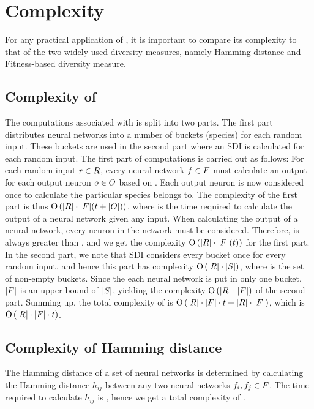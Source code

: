 \section{Complexity}\label{sec:complexity}
For any practical application of \dia{}, it is important to compare its complexity to that of the two widely used diversity measures, namely Hamming distance and Fitness-based diversity measure.

\subsection{Complexity of \dia}
The computations associated with \dia{} is split into two parts. The first part distributes neural networks into a number of buckets (species) for each random input. These buckets are used in the second part where an SDI is calculated for each random input. The first part of computations is carried out as follows: For each random input $r \in R$, every neural network $f \in F$ must calculate an output for each output neuron $o \in O$ based on \ran. Each output neuron \nnout{} is now considered once to calculate the particular species \ind{} belongs to. The complexity of the first part is thus $\operatorname{O}\left(\lvert R\rvert \cdot \lvert F\rvert(t+\lvert O\rvert)\right)$, where \timet{} is the time required to calculate the output of a neural network given any input. When calculating the output of a neural network, every neuron in the network must be considered. Therefore, \timet{} is always greater than \nnoutsetl, and we get the complexity $\operatorname{O}\left(\lvert R\rvert \cdot \lvert F\rvert(t)\right)$ for the first part. In the second part, we note that SDI considers every bucket once for every random input, and hence this part has complexity $\operatorname{O}\left(\lvert R\rvert\cdot\lvert S\rvert\right)$, where \bucketset{} is the set of non-empty buckets. Since the each neural network is put in only one bucket, $\lvert F\rvert$ is an upper bound of $\lvert S\rvert$, yielding the complexity $\operatorname{O}\left(\lvert R\rvert\cdot\lvert F\rvert\right)$ of the second part. Summing up, the total complexity of \dia{} is $\operatorname{O}\left(\lvert R\rvert \cdot \lvert F\rvert \cdot t + \lvert R\rvert \cdot \lvert F\rvert\right)$, which is $\operatorname{O}\left(\lvert R\rvert\cdot\lvert F\rvert\cdot t\right)$.

\subsection{Complexity of Hamming distance}
The Hamming distance of a set of neural networks \indset{} is determined by calculating the Hamming distance $h_{ij}$ between any two neural networks $f_i, f_j \in F$. The time required to calculate $h_{ij}$ is \bigO{\bitstringl}, hence we get a total complexity of \bigO{\indsetl^2 \cdot \bitstringl}.


